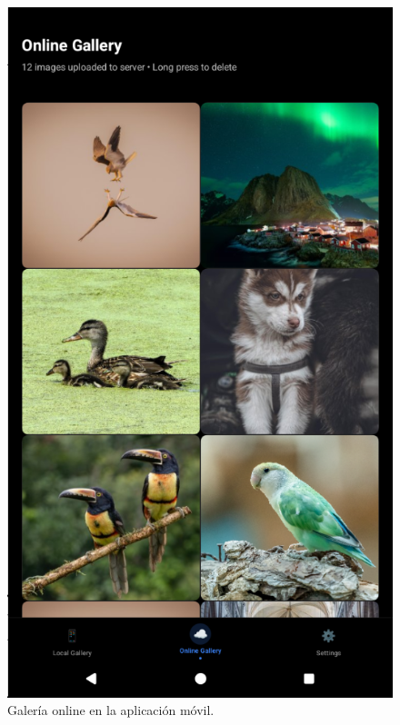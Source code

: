 \begin{figure}[H]
  \begin{minipage}[t]{0.3\textwidth}
    \centering
    \includegraphics[width=\textwidth]{assets/online-gallery-mobile.png}
    \caption{Galería online en la aplicación móvil.}
    \label{fig:online-gallery-mobile1}
  \end{minipage}
  \hfill
  \begin{minipage}[t]{0.3\textwidth}
    \centering

\end{minipage}
\end{figure}
